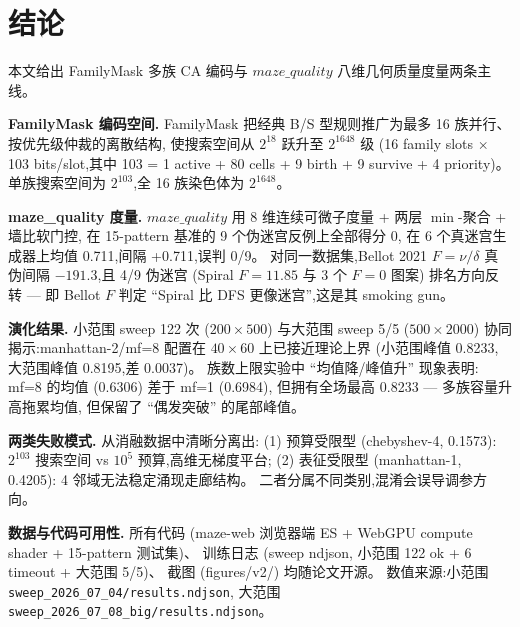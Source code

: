 
\section{结论}
\label{sec:conclusion}

本文给出 FamilyMask 多族 CA 编码与 $maze\_quality$ 八维几何质量度量两条主线。

\noindent\textbf{FamilyMask 编码空间.}
FamilyMask 把经典 B/S 型规则推广为最多 16 族并行、按优先级仲裁的离散结构,
使搜索空间从 $2^{18}$ 跃升至 $2^{1648}$ 级
(16 family slots $\times$ 103 bits/slot,其中 103 = 1 active + 80 cells + 9 birth + 9 survive + 4 priority)。
单族搜索空间为 $2^{103}$,全 16 族染色体为 $2^{1648}$。

\noindent\textbf{maze\_quality 度量.}
$maze\_quality$ 用 8 维连续可微子度量 + 两层 $\min$-聚合 + 墙比软门控,
在 15-pattern 基准的 9 个伪迷宫反例上全部得分 0,
在 6 个真迷宫生成器上均值 0.711,间隔 +0.711,误判 0/9。
对同一数据集,Bellot 2021 $F=\nu/\delta$ 真伪间隔 $-191.3$,且 4/9 伪迷宫
(Spiral $F=11.85$ 与 3 个 $F=0$ 图案) 排名方向反转 ---
即 Bellot $F$ 判定 ``Spiral 比 DFS 更像迷宫'',这是其 smoking gun。

\noindent\textbf{演化结果.}
小范围 sweep 122 次 ($200\!\times\!500$) 与大范围 sweep 5/5 ($500\!\times\!2000$)
协同揭示:manhattan-2/mf=8 配置在 $40\!\times\!60$ 上已接近理论上界
(小范围峰值 0.8233,大范围峰值 0.8195,差 0.0037)。
族数上限实验中 ``均值降/峰值升'' 现象表明:
mf=8 的均值 (0.6306) 差于 mf=1 (0.6984),
但拥有全场最高 0.8233 --- 多族容量升高拖累均值,
但保留了 ``偶发突破'' 的尾部峰值。

\noindent\textbf{两类失败模式.}
从消融数据中清晰分离出:
(1) 预算受限型 (chebyshev-4, 0.1573): $2^{103}$ 搜索空间 vs $10^5$ 预算,高维无梯度平台;
(2) 表征受限型 (manhattan-1, 0.4205): 4 邻域无法稳定涌现走廊结构。
二者分属不同类别,混淆会误导调参方向。

\medskip\bigskip\noindent\textbf{数据与代码可用性.}
所有代码 (maze-web 浏览器端 ES + WebGPU compute shader + 15-pattern 测试集)、
训练日志 (sweep ndjson, 小范围 122 ok + 6 timeout + 大范围 5/5)、
截图 (figures/v2/) 均随论文开源。
数值来源:小范围 \texttt{sweep\_2026\_07\_04/results.ndjson},
大范围 \texttt{sweep\_2026\_07\_08\_big/results.ndjson}。
